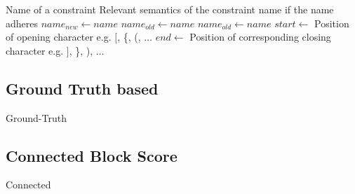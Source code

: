 			\begin{algorithm}[ht!]
				\centering
				\begin{algorithmic}
					\Require Name of a constraint
					\Ensure Relevant semantics of the constraint name if the name adheres 
					\Statex
						\State ${name}_{new} \gets name$
						\State ${name}_{old} \gets name$
						\Repeat
							\State ${name}_{old} \gets name$
							\State $start \gets$ Position of opening character e.g. $\lbrack$, \{, (, $\ldots$
							\State $end \gets$ Position of corresponding closing character e.g. $\rbrack$, \}, ), $\ldots$
					\EndFunction
				\end{algorithmic}
				\caption{}
				\label{algo:tree:scoring:nameheur}
			\end{algorithm}
			
			\clearpage
			

		\subsection{Ground Truth based}
		
			Ground-Truth
		
			\clearpage
	
		\subsection{Connected Block Score}
	
			Connected

			\clearpage